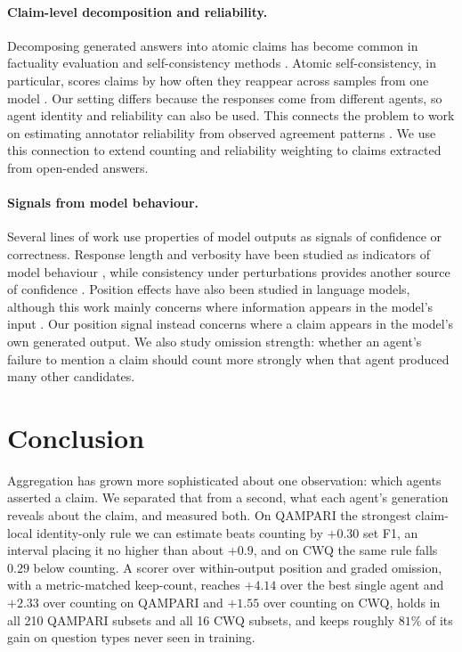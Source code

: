 \documentclass[11pt]{article}
\begin{document}
\paragraph{Claim-level decomposition and reliability.}
Decomposing generated answers into atomic claims has become common in factuality evaluation and self-consistency methods \citep{thirukovalluru2024atomic,zhang2024atomic,ning2025mad,wan2025fastfact,liu2025verifact,goel2025zero,panou2025harnessing}. Atomic self-consistency, in particular, scores claims by how often they reappear across samples from one model \citep{thirukovalluru2024atomic}. Our setting differs because the responses come from different agents, so agent identity and reliability can also be used. This connects the problem to work on estimating annotator reliability from observed agreement patterns \citep{dawid1979maximum,sinha2018fast,majdi2023crowd,kuzin2025improving}. We use this connection to extend counting and reliability weighting to claims extracted from open-ended answers.

\paragraph{Signals from model behaviour.}
Several lines of work use properties of model outputs as signals of confidence or correctness. Response length and verbosity have been studied as indicators of model behaviour \citep{janiak2025illusion,zhang2024verbosity}, while consistency under perturbations provides another source of confidence \citep{wu2026this,ahn2025prompt}. Position effects have also been studied in language models, although this work mainly concerns where information appears in the model's input \citep{guo2024serial,zhang2026position,salvatore2025lost,qiao2026llm}. Our position signal instead concerns where a claim appears in the model's own generated output. We also study omission strength: whether an agent's failure to mention a claim should count more strongly when that agent produced many other candidates.



\section{Conclusion}
\label{sec:conclusion}

Aggregation has grown more sophisticated about one observation: which agents asserted a claim. We separated that from a second, what each agent's generation reveals about the claim, and measured both. On QAMPARI the strongest claim-local identity-only rule we can estimate beats counting by $+0.30$ set F1, an interval placing it no higher than about $+0.9$, and on CWQ the same rule falls $0.29$ below counting. A scorer over within-output position and graded omission, with a metric-matched keep-count, reaches $+4.14$ over the best single agent and $+2.33$ over counting on QAMPARI and $+1.55$ over counting on CWQ, holds in all 210 QAMPARI subsets and all 16 CWQ subsets, and keeps roughly $81\%$ of its gain on question types never seen in training.
\end{document}
